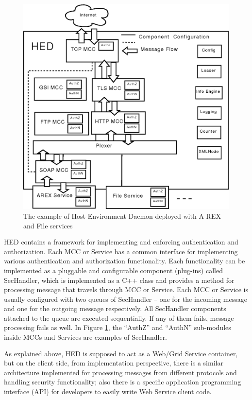 \documentclass[twocolumn]{svjour3}         %
\begin{document}
\begin{figure}
\includegraphics[width=0.9\columnwidth]{HED.png}
\caption{The example of Host Environment Daemon deployed with A-REX and File services}
\label{fig:HED}
\end{figure}
HED contains a framework for implementing and enforcing authentication and authorization. Each MCC or Service has a common interface for implementing various authentication and authorization functionality. Each functionality can be implemented as a pluggable and configurable component (plug-ins) called SecHandler, which is implemented as a C++ class and provides a method for processing message that travels through MCC or Service. Each MCC or Service is usually configured with two queues of SecHandler -- one for the incoming message and one for the outgoing message respectively. All SecHandler components attached to the queue are executed sequentially. If any of them fails, message processing fails as well. In Figure \ref{fig:HED}, the ``AuthZ'' and ``AuthN'' sub-modules inside MCCs and Services are examples of SecHandler.

As explained above, HED is supposed to act as a Web/Grid Service container, but on the client side, from implementation perspective, there is a similar architecture implemented for processing messages from different protocols and handling security functionality; also there is a specific application programming interface (API) for developers to easily write Web Service client code.
\end{document}
